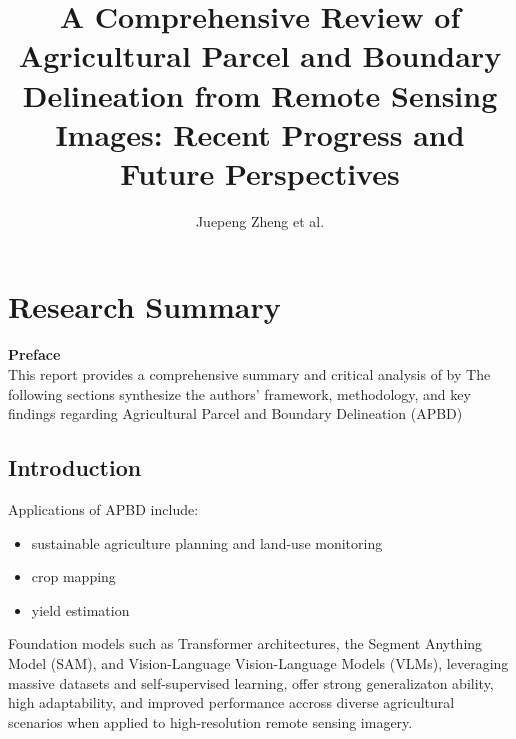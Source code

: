 \documentclass{report}
\title{A Comprehensive Review of Agricultural Parcel and Boundary Delineation from Remote Sensing Images: Recent Progress and Future Perspectives}
\author{Juepeng Zheng et al.}
\date{}
\begin{document}
\maketitle
\tableofcontents

\chapter{Research Summary}

\begin{center}
  \small
  \textbf{Preface} \\
  \vspace{1em}
  This report provides a comprehensive summary and critical analysis of 
   by \citeauthor{zheng2025comprehensivereviewagriculturalparcel} 
  The following sections synthesize the 
  authors' framework, methodology, and key findings regarding Agricultural 
  Parcel and Boundary Delineation (APBD)
  \vspace{1em}
\end{center}

\section{Introduction}


Applications of APBD include:
\begin{itemize}
  \item sustainable agriculture planning and land-use monitoring
  \item crop mapping
  \item yield estimation
\end{itemize}

Foundation models such as Transformer architectures, the Segment Anything Model (SAM), and Vision-Language
Vision-Language Models (VLMs), leveraging massive datasets and self-supervised learning, offer strong
generalizaton ability, high adaptability, and improved performance accross diverse agricultural
scenarios when applied to high-resolution remote sensing imagery.
\end{document}
